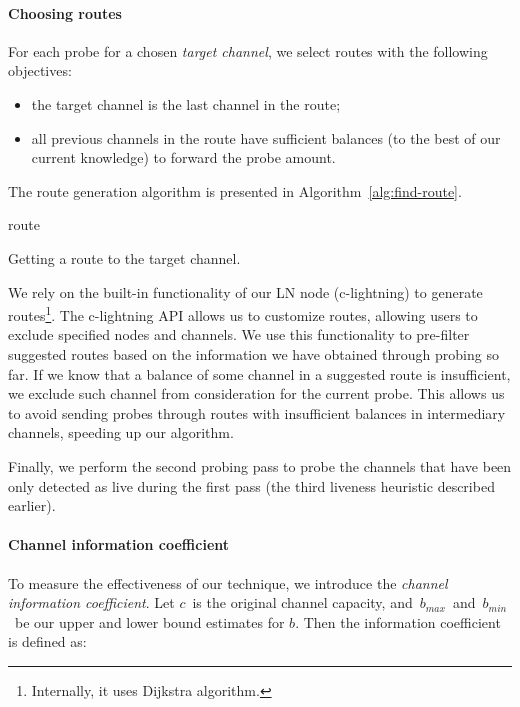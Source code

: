 \paragraph{Choosing routes}

For each probe for a chosen \textit{target channel}, we select routes with the following objectives:
\begin{itemize}
	\item the target channel is the last channel in the route;
	\item all previous channels in the route have sufficient balances (to the best of our current knowledge) to forward the probe amount.
\end{itemize}

The route generation algorithm is presented in Algorithm~\ref{alg:find-route}.

\begin{algorithm}
	 {
	}
	\Return route\;
	\caption{Getting a route to the target channel.}
	\label{alg:find-route}
\end{algorithm}

We rely on the built-in functionality of our LN node (c-lightning) to generate routes\footnote{Internally, it uses Dijkstra algorithm.}.
The c-lightning API allows us to customize routes, allowing users to exclude specified nodes and channels.
We use this functionality to pre-filter suggested routes based on the information we have obtained through probing so far.
If we know that a balance of some channel in a suggested route is insufficient, we exclude such channel from consideration for the current probe.
This allows us to avoid sending probes through routes with insufficient balances in intermediary channels, speeding up our algorithm.

Finally, we perform the second probing pass to probe the channels that have been only detected as live during the first pass (the third liveness heuristic described earlier).

\paragraph{Channel information coefficient}
To measure the effectiveness of our technique, we introduce the \textit{channel information coefficient}.
Let $c$~is the original channel capacity, and~$b_{max}$~and~$b_{min}$~be our upper and lower bound estimates for $b$.
Then the information coefficient is defined as:

